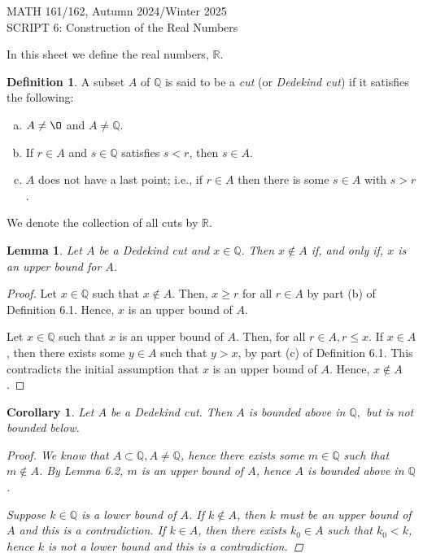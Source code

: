 \documentclass[11pt]{article}
\newcommand{\bbQ}{\mathbb{Q}}
\newcommand{\bbR}{\mathbb{R}}
\renewcommand{\emptyset}{\O}
\newtheorem{lemma}[theorem]{Lemma}
\newtheorem{corollary}[theorem]{Corollary}
\theoremstyle{definition}
\newtheorem{definition}[theorem]{Definition}
\newcommand{\head}[1]{
	\begin{center}
		{\large #1}
		\vspace{.2 in}
	\end{center}
	
	\bigskip 
}
\numberwithin{equation}{subsection}
\begin{document}
	

\head{ MATH 161/162, Autumn 2024/Winter 2025\\
	SCRIPT 6: Construction of the Real Numbers }




\setcounter{section}{6}
\setcounter{theorem}{0}

In this sheet we define the real numbers, $\bbR.$  

\begin{definition} 
	A subset $A$ of $\bbQ$ is said to be a \emph{cut} (or \emph{Dedekind cut}) if it satisfies the following: 
	\begin{enumerate}[(a)]
		\item $A \neq \emptyset$ and $A \neq {\mathbb Q}$.
		\item If $r \in A$ and $s \in \bbQ$ satisfies $s < r$, then $s \in A$.
		\item $A$ does not have a last point; i.e., if $r\in A$ then there is some $s \in A$ with $s > r$.
	\end{enumerate}
	We denote the collection of all cuts by $\bbR$.
\end{definition}

\begin{lemma}
	Let $A$ be a Dedekind cut and $x\in \bbQ.$ Then $x \notin A$ if, and only if, $x$ is an upper bound for $A$.
\end{lemma}
\begin{proof}
Let $x \in \bbQ$ such that $x \notin A$. Then, $x \geq r$ for all $r \in A$ by part (b) of Definition 6.1. Hence, $x$ is an upper bound of $A$.

Let $x \in \bbQ$ such that $x$ is an upper bound of $A$. Then, for all $r \in A, r \leq x$. If $x \in A$, then there exists some $y \in A$ such that $y >x$, by part (c) of Definition 6.1. This contradicts the initial assumption that $x$ is an upper bound of $A$. Hence, $x \notin A$.

\renewcommand\qedsymbol{QED}
\end{proof}

\begin{corollary}
Let $A$ be a Dedekind cut. Then $A$ is bounded above in $\bbQ,$ but is not bounded below.
\begin{proof}
We know that $A \subset \bbQ, A \neq \bbQ$, hence there exists some $m \in \bbQ$ such that $m \notin A$. By Lemma 6.2, $m$ is an upper bound of $A$, hence $A$ is bounded above in $\bbQ$.

Suppose $k \in \bbQ$ is a lower bound of $A$. If $k \notin A$, then $k$ must be an upper bound of $A$ and this is a contradiction. If $k \in A$, then there exists $k_0 \in A$ such that $k_0 < k$, hence $k$ is not a lower bound and this is a contradiction.

\renewcommand\qedsymbol{QED}
\end{proof}
\end{corollary}
\end{document}
